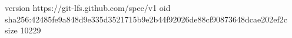 version https://git-lfs.github.com/spec/v1
oid sha256:42485fe9a848d9e335d3521715b9e2b44f92026de88cf90873648dcae202ef2c
size 10229
